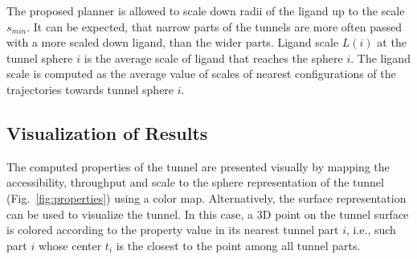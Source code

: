 \documentclass{svmult}
\def\smin{s_{min}}
\begin{document}
The proposed planner is allowed to scale down radii of the ligand up to the scale $\smin$. 
It can be expected, that narrow parts of the tunnels are more often passed with a more scaled down ligand, than
the wider parts.
Ligand scale $L(i)$ at the tunnel sphere $i$ is the average scale of ligand that reaches the sphere $i$.
The ligand scale is computed as the average value of scales of nearest configurations of the trajectories towards tunnel sphere
$i$.



\subsection{Visualization of Results}

The computed properties of the tunnel are presented visually by mapping the accessibility, throughput and scale to the sphere representation
of the tunnel (Fig.~\ref{fig:properties}) using a color map.
Alternatively, the surface representation can be used to visualize the tunnel.
In this case, a 3D point on the tunnel surface is colored according to the property value in its nearest tunnel part $i$,  i.e., such part $i$ whose center $t_i$ is the closest to the point among all tunnel parts.
\end{document}
